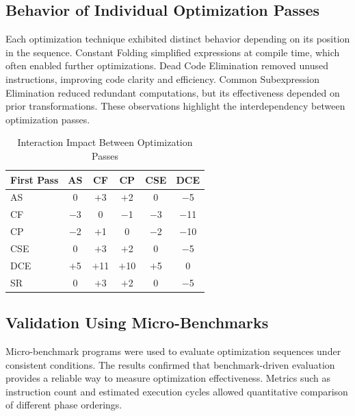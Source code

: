 \documentclass[conference]{IEEEtran}
\begin{document}
\subsection{Behavior of Individual Optimization Passes}
Each optimization technique exhibited distinct behavior depending on its position in the sequence. Constant Folding simplified expressions at compile time, which often enabled further optimizations. Dead Code Elimination removed unused instructions, improving code clarity and efficiency. Common Subexpression Elimination reduced redundant computations, but its effectiveness depended on prior transformations. These observations highlight the interdependency between optimization passes.

\begin{table}[!htbp]
\centering
\caption{Interaction Impact Between Optimization Passes}
\label{tab:pass_interaction}
\renewcommand{\arraystretch}{1.2}
{\small
\begin{tabularx}{\columnwidth}{@{}Xccccc@{}}
\toprule
\textbf{First Pass} & \textbf{AS} & \textbf{CF} & \textbf{CP} & \textbf{CSE} & \textbf{DCE} \\
\midrule
AS  & 0     & $+$3  & $+$2  & 0     & $-$5  \\
CF  & $-$3  & 0     & $-$1  & $-$3  & $-$11 \\
CP  & $-$2  & $+$1  & 0     & $-$2  & $-$10 \\
CSE & 0     & $+$3  & $+$2  & 0     & $-$5  \\
DCE & $+$5  & $+$11 & $+$10 & $+$5  & 0     \\
SR  & 0     & $+$3  & $+$2  & 0     & $-$5  \\
\bottomrule
\end{tabularx}
}
\end{table}

\subsection{Validation Using Micro-Benchmarks}
Micro-benchmark programs were used to evaluate optimization sequences under consistent conditions. The results confirmed that benchmark-driven evaluation provides a reliable way to measure optimization effectiveness. Metrics such as instruction count and estimated execution cycles allowed quantitative comparison of different phase orderings.
\end{document}
